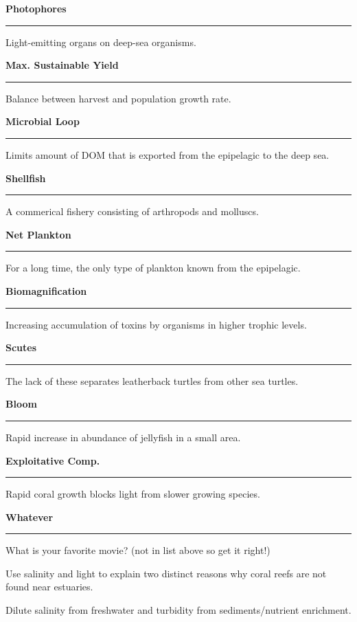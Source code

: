 \documentclass[11pt]{exam}
\newcommand*\Matching[1]{
\ifprintanswers
	\textbf{#1}
\else
	\rule{2.1in}{0.5pt}
\fi
}
\newlength\matchlena
\newlength\matchlenb
\newcommand\MatchQuestion[2]{%
	\setlength\matchlenb{\linewidth}
	\addtolength\matchlenb{-\matchlena}
	\parbox[t]{\matchlena}{\Matching{#1}}\enspace\parbox[t]{\matchlenb}{#2}}
\begin{document}
\begin{questions}

\vspace{-1\baselineskip}
\fullwidth{%

}
\vspace{0.7\baselineskip}

\question\MatchQuestion{Photophores}{Light-emitting organs on deep-sea organisms.}
\vspace{0.7\baselineskip}

\question\MatchQuestion{Max. Sustainable Yield}{Balance between harvest and population growth rate.}
\vspace{0.7\baselineskip}

\question\MatchQuestion{Microbial Loop}{Limits amount of DOM that is exported from the epipelagic to the deep sea.}
\vspace{0.7\baselineskip}

\question\MatchQuestion{Shellfish}{A commerical fishery consisting of arthropods and molluscs.}
\vspace{0.7\baselineskip}

\question\MatchQuestion{Net Plankton}{For a long time, the only type of plankton known from the epipelagic.}
\vspace{0.7\baselineskip}

\question\MatchQuestion{Biomagnification}{Increasing accumulation of toxins by organisms in higher trophic levels.}
\vspace{0.7\baselineskip}

\question\MatchQuestion{Scutes}{The lack of these separates leatherback turtles from other sea turtles.}
\vspace{0.7\baselineskip}

\question\MatchQuestion{Bloom}{Rapid increase in abundance of jellyfish in a small area.}
\vspace{0.7\baselineskip}

\question\MatchQuestion{Exploitative Comp.}{Rapid coral growth blocks light from slower growing species.}
\vspace{0.7\baselineskip}

\question\MatchQuestion{Whatever}{What is your favorite movie? (not in list above so get it right!)}
\vspace{0.7\baselineskip}

\newpage

\question[5]
Use salinity and light to explain two distinct reasons why coral reefs are not found near estuaries.
	\begin{solution}
	Dilute salinity from freshwater and turbidity from sediments/nutrient enrichment.
	\end{solution}


\end{questions}
\end{document}
